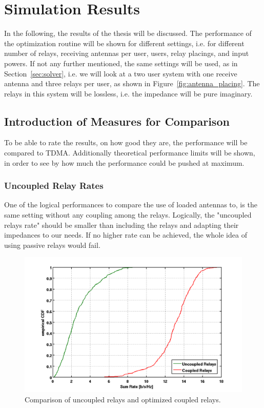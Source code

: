 \chapter{Simulation Results}
\label{sec:results}

In the following, the results of the thesis will be discussed.
The performance of the optimization routine will be shown for different settings, i.e. for different number of relays, receiving antennas per user, users, relay placings, and input powers.
If not any further mentioned, the same settings will be used, as in Section~\ref{sec:solver}, i.e.
we will look at a two user system with one receive antenna and three relays per user, as shown in Figure~\ref{fig:antenna_placing}.
The relays in this system will be lossless, i.e. the impedance will be pure imaginary.

\section{Introduction of Measures for Comparison}
\label{sec:measures}
To be able to rate the results, on how good they are, the performance will be compared to TDMA.
Additionally theoretical performance limits will be shown, in order to see by how much the performance could be pushed at maximum.

\subsection{Uncoupled Relay Rates}
One of the logical performances to compare the use of loaded antennas to, is the same setting without any coupling among the relays.
Logically, the "uncoupled relays rate" should be smaller than including the relays and adapting their impedances to our needs.
If no higher rate can be achieved, the whole idea of using passive relays would fail.
\begin{figure}[h]
\centering
  \includegraphics[width=0.7\linewidth]{images/Coupledcomparison.png}
\caption{Comparison of uncoupled relays and optimized coupled relays.}
\label{fig:coupledcomparison}
\end{figure}

